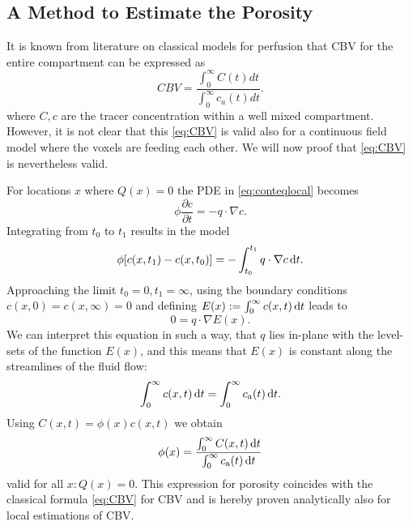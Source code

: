 \documentclass[paper=a4, fontsize=11pt,parskip=half,headings=small]{scrartcl}
\newcommand{\ca}{c_\mathrm{a}}
\begin{document}
	\subsection{A Method to Estimate the Porosity}\label{sec:CBV}
	
	It is known from literature on classical models for perfusion that CBV for the entire compartment can be expressed as
	\begin{equation}
		CBV = \frac{\int_0^\infty C(t) dt}{\int_0^\infty c_a(t) dt}.
		\label{eq:CBV}
	\end{equation}
	where $C,c$ are the tracer concentration within a well mixed compartment.
	However, it is not clear that this \eqref{eq:CBV} is valid also for a continuous field model where the voxels are feeding each other. We will now proof that \eqref{eq:CBV} is nevertheless valid.
	
	For locations $x$ where $Q(x) = 0$ the PDE in \eqref{eq:conteqlocal} becomes
	\begin{equation}
		\phi\frac{\partial c}{\partial t}  = - q \cdot \nabla c.
		\label{eq:1cmodel}
	\end{equation}
	Integrating from $t_0$ to $t_1$ results in the model
	\begin{equation}
		\phi [c(x,t_1) - c(x,t_0)]  = - \int_{t_0}^{t_1}q \cdot  \nabla c \,\mathrm{d} t.
	\end{equation}
	Approaching the limit $t_0 = 0, t_1 = \infty$, using the boundary conditions $c(x,0) = c(x,\infty) = 0$ and defining $E(x):= \int_0^\infty c(x,t) \,\mathrm{d} t$ leads to
	\begin{equation}
		0 = q \cdot \nabla  E(x).
		\label{eq:streamlinezero}
	\end{equation}
	We can interpret this equation in such a way, that $q$ lies in-plane with the level-sets of the function $E(x)$, and this means that $E(x)$ is constant along the streamlines of the fluid flow:
	\begin{equation}
		\int_0^\infty c(x,t) \diffint t = \int_0^\infty \ca(t) \diffint t.
	\end{equation}
	Using $C(x,t) = \phi(x) c(x,t)$ we obtain
	\begin{equation}
		\phi(x) =  \frac{ \int_{0}^{\infty} C(x,t) \diffint t }{ \int_{0}^{\infty} \ca(t) \diffint t}
		\label{eq:phi}
	\end{equation}
	valid for all $x: Q(x) = 0$.
	This expression for porosity coincides with the classical formula \eqref{eq:CBV} for CBV and is hereby proven analytically also for local estimations of CBV.
	
\end{document}
